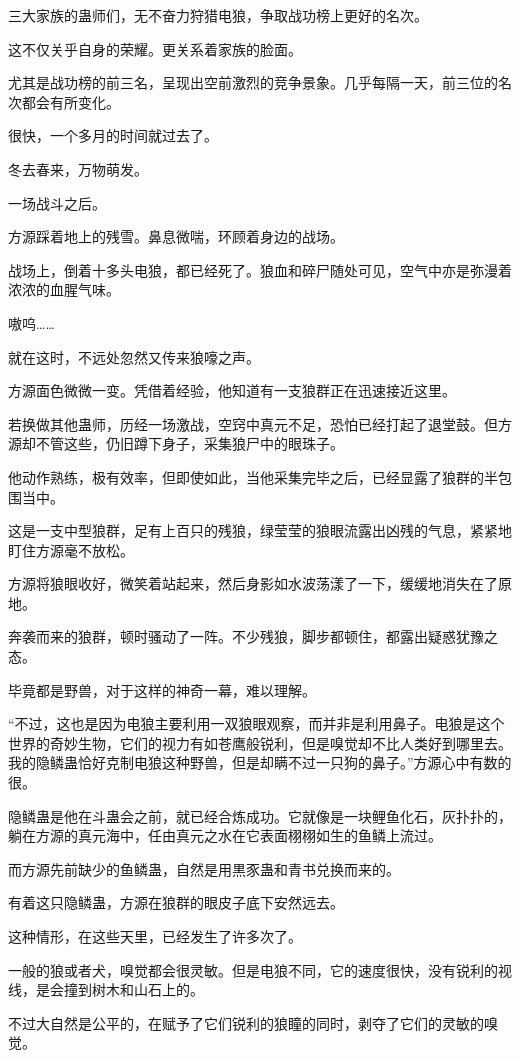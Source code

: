 \begin{this_body}
三大家族的蛊师们，无不奋力狩猎电狼，争取战功榜上更好的名次。

这不仅关乎自身的荣耀。更关系着家族的脸面。

尤其是战功榜的前三名，呈现出空前激烈的竞争景象。几乎每隔一天，前三位的名次都会有所变化。

很快，一个多月的时间就过去了。

冬去春来，万物萌发。

一场战斗之后。

方源踩着地上的残雪。鼻息微喘，环顾着身边的战场。

战场上，倒着十多头电狼，都已经死了。狼血和碎尸随处可见，空气中亦是弥漫着浓浓的血腥气味。

嗷呜……

就在这时，不远处忽然又传来狼嚎之声。

方源面色微微一变。凭借着经验，他知道有一支狼群正在迅速接近这里。

若换做其他蛊师，历经一场激战，空窍中真元不足，恐怕已经打起了退堂鼓。但方源却不管这些，仍旧蹲下身子，采集狼尸中的眼珠子。

他动作熟练，极有效率，但即使如此，当他采集完毕之后，已经显露了狼群的半包围当中。

这是一支中型狼群，足有上百只的残狼，绿莹莹的狼眼流露出凶残的气息，紧紧地盯住方源毫不放松。

方源将狼眼收好，微笑着站起来，然后身影如水波荡漾了一下，缓缓地消失在了原地。

奔袭而来的狼群，顿时骚动了一阵。不少残狼，脚步都顿住，都露出疑惑犹豫之态。

毕竟都是野兽，对于这样的神奇一幕，难以理解。

“不过，这也是因为电狼主要利用一双狼眼观察，而并非是利用鼻子。电狼是这个世界的奇妙生物，它们的视力有如苍鹰般锐利，但是嗅觉却不比人类好到哪里去。我的隐鳞蛊恰好克制电狼这种野兽，但是却瞒不过一只狗的鼻子。”方源心中有数的很。

隐鳞蛊是他在斗蛊会之前，就已经合炼成功。它就像是一块鲤鱼化石，灰扑扑的，躺在方源的真元海中，任由真元之水在它表面栩栩如生的鱼鳞上流过。

而方源先前缺少的鱼鳞蛊，自然是用黒豕蛊和青书兑换而来的。

有着这只隐鳞蛊，方源在狼群的眼皮子底下安然远去。

这种情形，在这些天里，已经发生了许多次了。

一般的狼或者犬，嗅觉都会很灵敏。但是电狼不同，它的速度很快，没有锐利的视线，是会撞到树木和山石上的。

不过大自然是公平的，在赋予了它们锐利的狼瞳的同时，剥夺了它们的灵敏的嗅觉。


\end{this_body}
